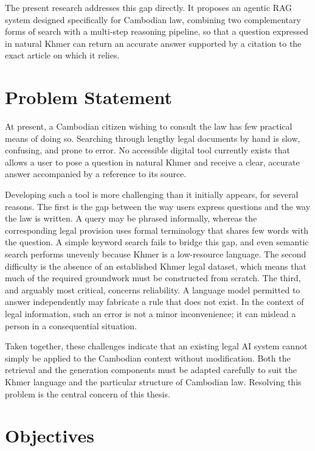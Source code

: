 \hs The present research addresses this gap directly. It proposes an agentic RAG system
designed specifically for Cambodian law, combining two complementary forms of search
with a multi-step reasoning pipeline, so that a question expressed in natural Khmer can
return an accurate answer supported by a citation to the exact article on which it
relies.

\section{Problem Statement}

\hs At present, a Cambodian citizen wishing to consult the law has few practical means
of doing so. Searching through lengthy legal documents by hand is slow, confusing, and
prone to error. No accessible digital tool currently exists that allows a user to pose a
question in natural Khmer and receive a clear, accurate answer accompanied by a reference
to its source.

\hs Developing such a tool is more challenging than it initially appears, for several
reasons. The first is the gap between the way users express questions and the way the
law is written. A query may be phrased informally, whereas the corresponding legal
provision uses formal terminology that shares few words with the question. A simple
keyword search fails to bridge this gap, and even semantic search performs unevenly
because Khmer is a low-resource language. The second difficulty is the absence of an
established Khmer legal dataset, which means that much of the required groundwork must be
constructed from scratch. The third, and arguably most critical, concerns reliability. A
language model permitted to answer independently may fabricate a rule that does not
exist. In the context of legal information, such an error is not a minor inconvenience;
it can mislead a person in a consequential situation.

\hs Taken together, these challenges indicate that an existing legal AI system cannot
simply be applied to the Cambodian context without modification. Both the retrieval and
the generation components must be adapted carefully to suit the Khmer language and the
particular structure of Cambodian law. Resolving this problem is the central concern of
this thesis.

\newpage
\section{Objectives}

